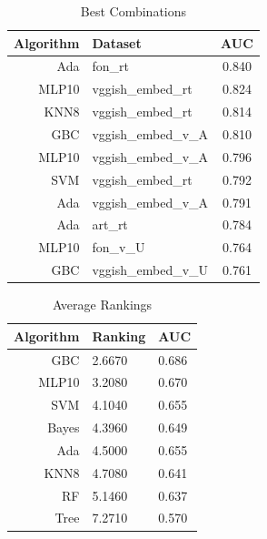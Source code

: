 \documentclass[a4paper,10pt]{article}
\begin{document}
\begin{table}[!htp]
\centering
\caption{Best Combinations}
\begin{tabular}{rl|c}
Algorithm&Dataset&AUC\\
\hline
Ada&fon\_rt&0.840 \\
MLP10&vggish\_embed\_rt&0.824 \\
KNN8&vggish\_embed\_rt&0.814 \\
GBC&vggish\_embed\_v\_A&0.810 \\
MLP10&vggish\_embed\_v\_A&0.796 \\
SVM&vggish\_embed\_rt&0.792 \\
Ada&vggish\_embed\_v\_A&0.791 \\
Ada&art\_rt&0.784 \\
MLP10&fon\_v\_U&0.764 \\
GBC&vggish\_embed\_v\_U&0.761 \\
\end{tabular}
\end{table}
\begin{table}[!htp]
\centering
\caption{Average Rankings}
\begin{tabular}{r|l|l}
Algorithm&Ranking&AUC\\
\hline
 GBC & 2.6670 & 0.686 \\
 MLP10 & 3.2080 & 0.670 \\
 SVM & 4.1040 & 0.655 \\
 Bayes & 4.3960 & 0.649 \\
 Ada & 4.5000 & 0.655 \\
 KNN8 & 4.7080 & 0.641 \\
 RF & 5.1460 & 0.637 \\
 Tree & 7.2710 & 0.570 \\
\end{tabular}
\end{table}
\end{document}
